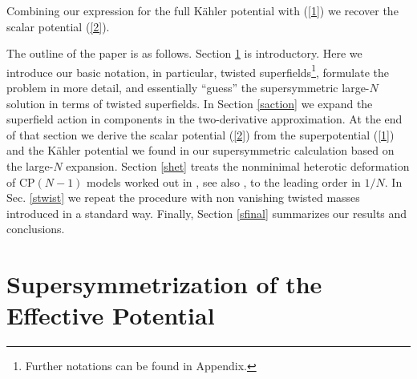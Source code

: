 \documentclass[epsfig,12pt]{article}
\begin{document}
	Combining our expression for the full  K\"ahler potential with (\ref{1}) we recover the scalar potential (\ref{2}). 

	The outline of the paper is as follows. 
	Section \ref{ssuper} is introductory.
	Here we introduce our basic notation, in particular, 
	twisted superfields\footnote{Further notations can be found in Appendix.}, formulate the problem in more detail, 
	and essentially ``guess'' the supersymmetric large-$N$ solution in terms of twisted superfields.
	In Section \ref{saction} we expand the superfield action in components in the two-derivative approximation.
	At the end of that section we derive the scalar potential (\ref{2}) from the superpotential (\ref{1}) 
	and the K\"ahler potential we found in our supersymmetric calculation based on the large-$N$ expansion.
	Section \ref{shet} treats the nonminimal heterotic deformation of CP$(N-1)$ models worked out in \cite{EdTo,SY1}, 
	see also \cite{SYhet,BSYhet,BSY1}, to the leading order in $1/N$. 
	In Sec. \ref{stwist} we repeat the procedure with non vanishing twisted masses introduced in a standard way. 
	Finally, Section \ref{sfinal} summarizes our results and conclusions.


\section{Supersymmetrization of the Effective Potential}
\label{ssuper}
\end{document}
